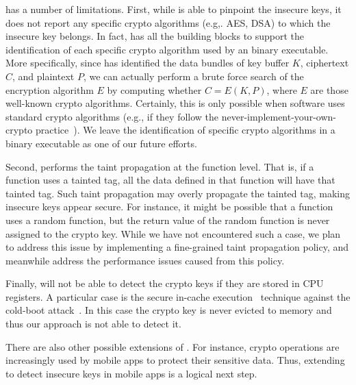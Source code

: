 \sysname %
has a number of limitations. %
%
%
First, while \sysname is able to pinpoint the insecure keys, it does not report any specific crypto algorithms (e.g,. \textsf{\small AES}, \textsf{\small DSA}) to which the insecure key belongs. 
In fact, \sysname has all the building blocks to support the identification of each specific crypto algorithm used by an binary executable. 
More specifically, since \sysname has identified the data bundles of key buffer $K$, ciphertext $C$, and plaintext $P$, we can actually perform a brute force search of the encryption algorithm $E$ by computing whether $C = E (K, P)$, where $E$ are those well-known crypto algorithms. 
Certainly, this is only possible when software uses standard crypto algorithms (e.g., if they follow the never-implement-your-own-crypto practice~\cite{schneier1999cryptography, apvrille2005secure}). 
We leave the identification of specific crypto algorithms in a binary executable as one of our future efforts.

Second, \sysname performs the taint propagation at the function level. 
That is, if a function uses a tainted tag, all the data defined in that function will have that tainted tag. 
Such taint propagation may overly propagate the tainted tag, making insecure keys appear secure. 
For instance, it might be possible that a function uses a random function, but the return value of the random function is never assigned to the crypto key. 
While we have not encountered such a case, we plan to address this issue by implementing a fine-grained taint propagation policy, and meanwhile address the performance issues caused from this policy.

Finally, \sysname will not be able to detect the crypto keys if they are stored in CPU registers. 
A particular case is the secure in-cache execution~\cite{guan2014copker, chen2017secure} technique against the cold-boot attack~\cite{halderman2009lest}.
In this case the crypto key is never evicted to memory and thus our approach is not able to detect it.

There are also other possible extensions of \sysname. 
For instance, crypto operations are increasingly used by mobile apps to protect their sensitive data. Thus, extending \sysname to detect insecure keys in mobile apps is a logical next step. 

